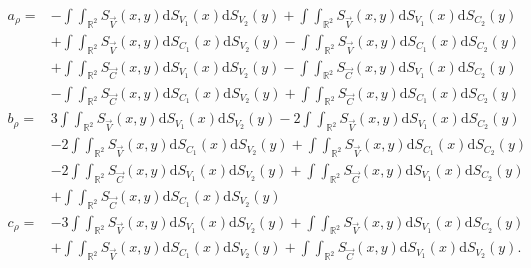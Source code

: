 \begin{align*}
    a_\rho=&-\int\int_{\mathbb{R}^2}S_{\vec{V}}\left(x,y\right)\mathrm{d}S_{V_1}\left(x\right)\mathrm{d}S_{V_2}\left(y\right)+\int\int_{\mathbb{R}^2}S_{\vec{V}}\left(x,y\right)\mathrm{d}S_{V_1}\left(x\right)\mathrm{d}S_{C_2}\left(y\right)\\
    &+\int\int_{\mathbb{R}^2}S_{\vec{V}}\left(x,y\right)\mathrm{d}S_{C_1}\left(x\right)\mathrm{d}S_{V_2}\left(y\right)-\int\int_{\mathbb{R}^2}S_{\vec{V}}\left(x,y\right)\mathrm{d}S_{C_1}\left(x\right)\mathrm{d}S_{C_2}\left(y\right)\\
    &+\int\int_{\mathbb{R}^2}S_{\vec{C}}\left(x,y\right)\mathrm{d}S_{V_1}\left(x\right)\mathrm{d}S_{V_2}\left(y\right)-\int\int_{\mathbb{R}^2}S_{\vec{C}}\left(x,y\right)\mathrm{d}S_{V_1}\left(x\right)\mathrm{d}S_{C_2}\left(y\right)\\
    &-\int\int_{\mathbb{R}^2}S_{\vec{C}}\left(x,y\right)\mathrm{d}S_{C_1}\left(x\right)\mathrm{d}S_{V_2}\left(y\right)+\int\int_{\mathbb{R}^2}S_{\vec{C}}\left(x,y\right)\mathrm{d}S_{C_1}\left(x\right)\mathrm{d}S_{C_2}\left(y\right)\\
    b_\rho=&3\int\int_{\mathbb{R}^2}S_{\vec{V}}\left(x,y\right)\mathrm{d}S_{V_1}\left(x\right)\mathrm{d}S_{V_2}\left(y\right)-2\int\int_{\mathbb{R}^2}S_{\vec{V}}\left(x,y\right)\mathrm{d}S_{V_1}\left(x\right)\mathrm{d}S_{C_2}\left(y\right)\\
    &-2\int\int_{\mathbb{R}^2}S_{\vec{V}}\left(x,y\right)\mathrm{d}S_{C_1}\left(x\right)\mathrm{d}S_{V_2}\left(y\right)+\int\int_{\mathbb{R}^2}S_{\vec{V}}\left(x,y\right)\mathrm{d}S_{C_1}\left(x\right)\mathrm{d}S_{C_2}\left(y\right)\\
    &-2\int\int_{\mathbb{R}^2}S_{\vec{C}}\left(x,y\right)\mathrm{d}S_{V_1}\left(x\right)\mathrm{d}S_{V_2}\left(y\right)+\int\int_{\mathbb{R}^2}S_{\vec{C}}\left(x,y\right)\mathrm{d}S_{V_1}\left(x\right)\mathrm{d}S_{C_2}\left(y\right)\\
    &+\int\int_{\mathbb{R}^2}S_{\vec{C}}\left(x,y\right)\mathrm{d}S_{C_1}\left(x\right)\mathrm{d}S_{V_2}\left(y\right)\\
    c_\rho=&-3\int\int_{\mathbb{R}^2}S_{\vec{V}}\left(x,y\right)\mathrm{d}S_{V_1}\left(x\right)\mathrm{d}S_{V_2}\left(y\right)+\int\int_{\mathbb{R}^2}S_{\vec{V}}\left(x,y\right)\mathrm{d}S_{V_1}\left(x\right)\mathrm{d}S_{C_2}\left(y\right)\\
    &+\int\int_{\mathbb{R}^2}S_{\vec{V}}\left(x,y\right)\mathrm{d}S_{C_1}\left(x\right)\mathrm{d}S_{V_2}\left(y\right)+\int\int_{\mathbb{R}^2}S_{\vec{C}}\left(x,y\right)\mathrm{d}S_{V_1}\left(x\right)\mathrm{d}S_{V_2}\left(y\right).
\end{align*}
